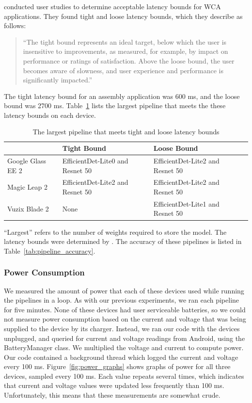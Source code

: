 \citet{chen2017} conducted user studies to determine acceptable latency bounds
for WCA applications.
They found tight and loose latency bounds, which they describe as follows:
\begin{quotation}
``The tight bound represents an ideal target, below which the
user is insensitive to improvements, as measured, for example,
by impact on performance or ratings of satisfaction. Above
the loose bound, the user becomes aware of slowness, and
user experience and performance is significantly impacted.''
\end{quotation}
The tight latency bound for an assembly application was 600 ms, and the loose
bound was 2700 ms.
Table~\ref{tab:mobile_accuracy} lists the largest pipeline
that meets the these latency bounds on each device.

\begin{table}
\begin{tabular}{|l||l|l|l|}
  \hline
  & Tight Bound & Loose Bound\\
  \hline
  \hline
  Google Glass EE 2 & EfficientDet-Lite0 and Resnet 50 & EfficientDet-Lite2 and Resnet 50\\
  Magic Leap 2 & EfficientDet-Lite2 and Resnet 50 & EfficientDet-Lite2 and Resnet 50\\
  Vuzix Blade 2 & None & EfficientDet-Lite1 and Resnet 50\\
  \hline
\end{tabular}
\begin{captiontext}
  ``Largest'' refers to the number of weights required to store the model.
  The latency bounds were determined by \citet{chen2017}.
  The accuracy of these pipelines is listed in
  Table~\ref{tab:pipeline_accuracy}.
  \end{captiontext}
\caption{
  The largest pipeline that meets tight and loose latency bounds
  }\label{tab:mobile_accuracy}
\end{table}

\subsubsection{Power Consumption}\label{sec:mobile_power_consumption}

We measured the amount of power that each of these devices used while running
the pipelines in a loop.
As with our previous experiments, we ran each pipeline for five minutes.
None of these devices had user serviceable batteries, so we could not measure
power consumption based on the current and voltage that was being
supplied to the device by its charger.
Instead, we ran our code with the devices unplugged, and queried for current and
voltage readings from Android, using the BatteryManager class.
We multiplied the voltage and current to compute power.
Our code contained a background thread which logged the current and voltage
every 100 ms.
Figure~\ref{fig:power_graphs} shows graphs of power for all three devices,
sampled every 100 ms.
Each value repeats several times, which indicates that current and voltage
values were updated less frequently than 100 ms.
Unfortunately, this means that these measurements are somewhat crude.

